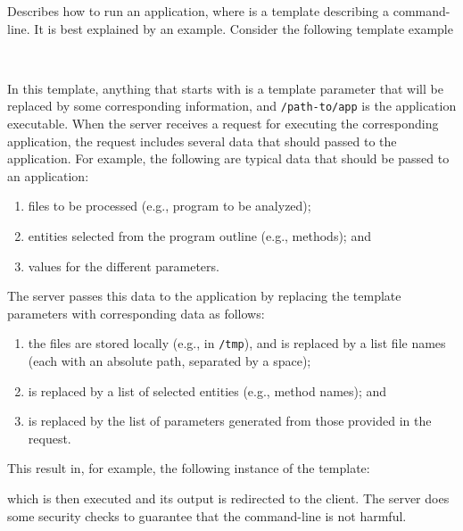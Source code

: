 \noindent
{}
{%
%
  Describes how to run an application, where
   is a template describing a
  command-line. It is best explained by an example. Consider the
  following template example

  \bigskip
  ~~~
  
  \bigskip
  \noindent
  In this template, anything that starts with 
  is a template parameter that will be replaced by some corresponding
  information, and \texttt{/path-to/app} is the application
  executable.
  When the server receives a request for executing the corresponding
  application, the request includes several data that should passed to
  the application. For example, the following are typical data that
  should be passed to an application:
  \begin{enumerate}
  \item files to be processed (e.g., program to be analyzed);
  \item entities selected from the program outline (e.g., methods); and
  \item values for the different parameters.
  \end{enumerate}
  The server passes this data to the application by replacing the
  template parameters with corresponding data as follows:
  \begin{enumerate}
  \item the files are stored locally (e.g., in \texttt{/tmp}), and
     is replaced by a list file names
    (each with an absolute path, separated by a space);
  \item {} is replaced by a list of
    selected entities (e.g., method names); and
  \item {} is replaced by the list of
    parameters generated from those provided in the request.
  \end{enumerate}
  This result in, for example, the following instance of the template:

  \bigskip
  \hspace{0.7cm}

  \bigskip 
  \noindent
  which is then executed and its output is redirected to the
  client. The server does some security checks to guarantee that the
  command-line is not harmful. %

}
